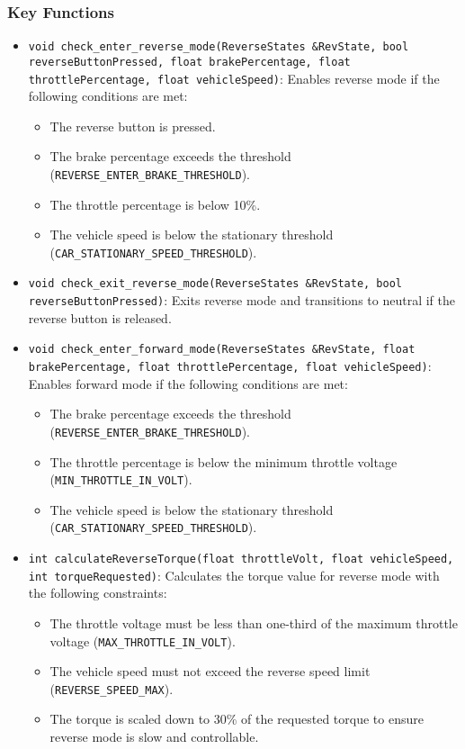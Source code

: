 \documentclass[a4paper,12pt]{article}
\begin{document}
\subsubsection{Key Functions}
\begin{itemize}
    \item \texttt{void check\_enter\_reverse\_mode(ReverseStates \&RevState, bool reverseButtonPressed, float brakePercentage, float throttlePercentage, float vehicleSpeed)}:
    Enables reverse mode if the following conditions are met:
    \begin{itemize}
        \item The reverse button is pressed.
        \item The brake percentage exceeds the threshold (\texttt{REVERSE\_ENTER\_BRAKE\_THRESHOLD}).
        \item The throttle percentage is below 10\%.
        \item The vehicle speed is below the stationary threshold (\texttt{CAR\_STATIONARY\_SPEED\_THRESHOLD}).
    \end{itemize}

    \item \texttt{void check\_exit\_reverse\_mode(ReverseStates \&RevState, bool reverseButtonPressed)}:
    Exits reverse mode and transitions to neutral if the reverse button is released.

    \item \texttt{void check\_enter\_forward\_mode(ReverseStates \&RevState, float brakePercentage, float throttlePercentage, float vehicleSpeed)}:
    Enables forward mode if the following conditions are met:
    \begin{itemize}
        \item The brake percentage exceeds the threshold (\texttt{REVERSE\_ENTER\_BRAKE\_THRESHOLD}).
        \item The throttle percentage is below the minimum throttle voltage (\texttt{MIN\_THROTTLE\_IN\_VOLT}).
        \item The vehicle speed is below the stationary threshold (\texttt{CAR\_STATIONARY\_SPEED\_THRESHOLD}).
    \end{itemize}

    \item \texttt{int calculateReverseTorque(float throttleVolt, float vehicleSpeed, int torqueRequested)}:
    Calculates the torque value for reverse mode with the following constraints:
    \begin{itemize}
        \item The throttle voltage must be less than one-third of the maximum throttle voltage (\texttt{MAX\_THROTTLE\_IN\_VOLT}).
        \item The vehicle speed must not exceed the reverse speed limit (\texttt{REVERSE\_SPEED\_MAX}).
        \item The torque is scaled down to 30\% of the requested torque to ensure reverse mode is slow and controllable.
    \end{itemize}
\end{itemize}
\end{document}
